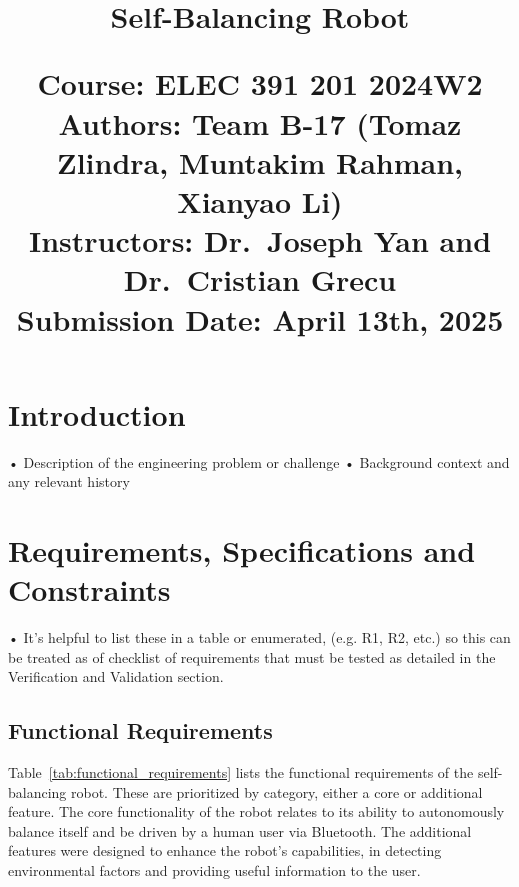 \documentclass{article}
\title{
    \Huge \textbf{Self-Balancing Robot}

    \vspace{100px}

    \large Course: ELEC 391 201 2024W2 \\[1em]
    \large Authors: Team B-17 (Tomaz Zlindra, Muntakim Rahman, Xianyao Li) \\[1em]
    \large Instructors: Dr.\ Joseph Yan and Dr.\ Cristian Grecu \\[1em]
    \large Submission Date: April 13th, 2025 \\
}
\date{} %
\begin{document}
\maketitle

\newpage %

\tableofcontents %

\newpage %

\section{Introduction}

• Description of the engineering problem or challenge
• Background context and any relevant history

\section{Requirements, Specifications and Constraints}
• It's helpful to list these in a table or enumerated, (e.g. R1, R2, etc.) so this can be treated as of checklist of
requirements that must be tested as detailed in the Verification and Validation section.
\subsection{Functional Requirements}

Table~\ref{tab:functional_requirements} lists the functional requirements of the self-balancing robot. These are prioritized by category,
either a core or additional feature. The core functionality of the robot relates to its ability to autonomously balance itself and be driven
by a human user via Bluetooth. The additional features were designed to enhance the robot's capabilities, in detecting environmental factors and
providing useful information to the user.
\end{document}
